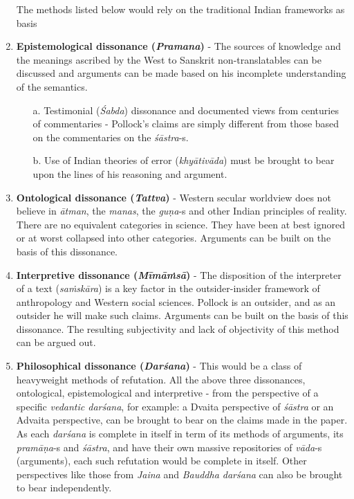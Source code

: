 \begin{enumerate}
The methods listed below would rely on the traditional Indian frameworks as basis

\item {\bf Epistemological dissonance ({{\sl\bfseries Pramana}\relax})} - The sources of knowledge and the meanings ascribed by the West to Sanskrit non-translatables can be discussed and arguments can be made based on his incomplete understanding of the semantics.
\begin{itemize}
\item[a.]  Testimonial ({\sl Śabda}) dissonance and documented views from centuries of commentaries - Pollock's claims are simply different from those based on the commentaries on the {\sl śāstra}-s.

\item[b.] Use of Indian theories of error ({\sl khyātivāda}) must be brought to bear upon the lines of his reasoning and argument.
\end{itemize}

\item {\bf Ontological dissonance ({{\sl\bfseries Tattva}\relax})} -  Western secular worldview does not believe in {\sl ātman}, the {\sl manas}, the {\sl guṇa}-s and other Indian principles of reality. There are no equivalent categories in science. They have been at best ignored or at worst collapsed into other categories. Arguments can be built on the basis of this dissonance.

\item {\bf Interpretive dissonance ({{\sl\bfseries Mīmāṁsā}\relax})} - The disposition of the interpreter of a text ({\sl saṁskāra}) is a key factor in the outsider-insider framework of anthropology and Western social sciences. Pollock is an outsider, and as an outsider he will make such claims. Arguments can be built on the basis of this dissonance. The resulting subjectivity and lack of objectivity of this method can be argued out.

\item {\bf Philosophical dissonance ({{\sl\bfseries Darśana}\relax})} - This would be a class of heavyweight methods of refutation. All the above three dissonances, ontological, epistemological and interpretive - from the perspective of a specific {\sl vedantic darśana}, for example: a Dvaita perspective of {\sl śāstra} or an Advaita perspective, can be brought to bear on the claims made in the paper. As each {\sl darśana} is complete in itself in term of its methods of arguments, its {\sl pramāṇa}-s and {\sl śāstra}, and have their own massive repositories of {\sl vāda}-s (arguments), each such refutation would be complete in itself. Other perspectives like those from {\sl Jaina} and {\sl Bauddha darśana} can also be brought to bear independently.


\end{enumerate}

